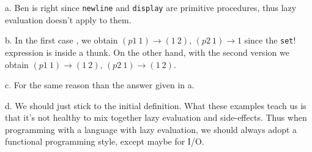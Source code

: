 \documentclass[a4paper,12pt]{article}
\newcommand{\subpar}[1]{\medskip \noindent #1.}
\begin{document}
\subpar{a} Ben is right since \lstinline!newline! and
\lstinline!display! are primitive procedures, thus lazy evaluation
doesn't apply to them.

\subpar{b} In the first case , we obtain $(p1\ 1) \rightarrow (1\ 2)$,
$(p2\ 1) \rightarrow 1$ since the \lstinline!set!! expression is
inside a thunk.  On the other hand, with the second version we obtain
$(p1\ 1) \rightarrow (1\ 2)$, $(p2\ 1) \rightarrow (1\ 2)$.

\subpar{c} For the same reason than the answer given in a.

\subpar{d} We should just stick to the initial definition.  What these
examples teach us is that it's not healthy to mix together lazy
evaluation and side-effects.  Thus when programming with a language
with lazy evaluation, we should always adopt a functional programming
style, except maybe for I/O.
\end{document}

